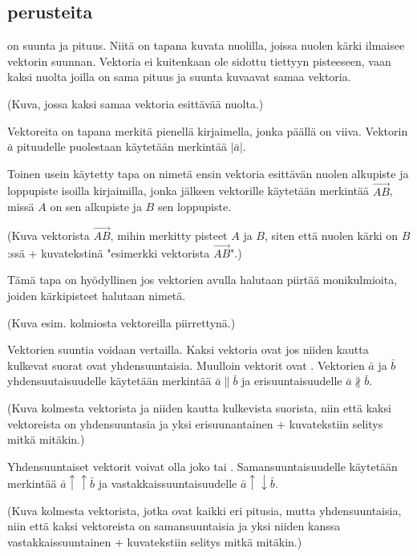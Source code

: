 \subsection{perusteita}

 on suunta ja pituus. Niitä on tapana kuvata nuolilla, joissa nuolen kärki ilmaisee vektorin suunnan. Vektoria ei kuitenkaan ole sidottu tiettyyn pisteeseen, vaan kaksi nuolta joilla on sama pituus ja suunta kuvaavat samaa vektoria.

(Kuva, jossa kaksi samaa vektoria esittävää nuolta.)

Vektoreita on tapana merkitä pienellä kirjaimella, jonka päällä on viiva. Vektorin $\bar{a}$ pituudelle puolestaan käytetään merkintää $|\bar{a}|$.

Toinen usein käytetty tapa on nimetä ensin vektoria esittävän nuolen alkupiste ja loppupiste isoilla kirjaimilla, jonka jälkeen vektorille käytetään merkintää $\overrightarrow{AB}$, missä $A$ on sen alkupiste ja $B$ sen loppupiste. 

(Kuva vektorista $\overrightarrow{AB}$, mihin merkitty pisteet $A$ ja $B$, siten että nuolen kärki on $B$:ssä + kuvatekstinä "esimerkki vektorista $\overrightarrow{AB}$".) 

Tämä tapa on hyödyllinen jos vektorien avulla halutaan piirtää monikulmioita, joiden kärkipisteet halutaan nimetä.

(Kuva esim. kolmiosta vektoreilla piirrettynä.)

Vektorien suuntia voidaan vertailla. Kaksi vektoria ovat  jos niiden kautta kulkevat suorat ovat yhdensuuntaisia. Muulloin vektorit ovat . Vektorien $\bar{a}$ ja $\bar{b}$ yhdensuutaisuudelle käytetään merkintää $\bar{a} \parallel \bar{b}$ ja erisuuntaisuudelle $\bar{a} \nparallel \bar{b}$.

(Kuva kolmesta vektorista ja niiden kautta kulkevista suorista, niin että kaksi vektoreista on yhdensuuntasia ja yksi erisuunantainen + kuvatekstiin selitys mitkä mitäkin.)

Yhdensuuntaiset vektorit voivat olla joko  tai . Samansuuntaisuudelle käytetään merkintää $\bar{a} \uparrow \uparrow  \bar{b}$ ja vastakkaissuuntaisuudelle $\bar{a} \uparrow \downarrow \bar{b}$.

(Kuva kolmesta vektorista, jotka ovat kaikki eri pitusia, mutta yhdensuuntaisia, niin että kaksi vektoreista on samansuuntaisia ja yksi niiden kanssa vastakkaissuuntainen + kuvatekstiin selitys mitkä mitäkin.)

